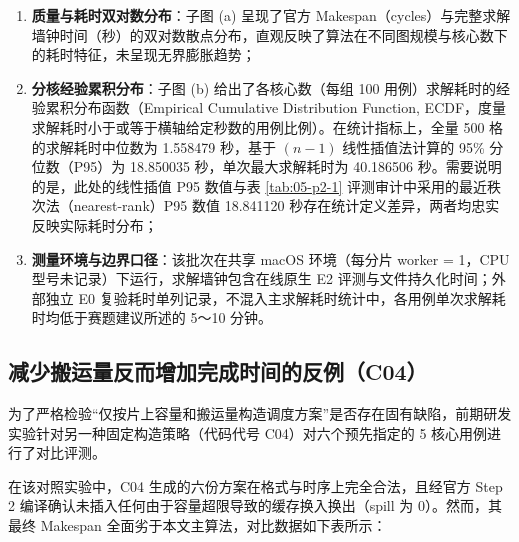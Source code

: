 \documentclass[anonymous,withtoc]{gmcm2026}
\providecommand{\tightlist}{\setlength{\itemsep}{0pt}\setlength{\parskip}{0pt}}
\begin{document}
\begin{enumerate}
\def\labelenumi{\arabic{enumi}.}
\tightlist
\item
  \textbf{质量与耗时双对数分布}：子图 (a) 呈现了官方 Makespan（cycles）与完整求解墙钟时间（秒）的双对数散点分布，直观反映了算法在不同图规模与核心数下的耗时特征，未呈现无界膨胀趋势；
\item
  \textbf{分核经验累积分布}：子图 (b) 给出了各核心数（每组 100 用例）求解耗时的经验累积分布函数（Empirical Cumulative Distribution Function, ECDF，度量求解耗时小于或等于横轴给定秒数的用例比例）。在统计指标上，全量 500 格的求解耗时中位数为 1.558479 秒，基于 \((n-1)\) 线性插值法计算的 95\% 分位数（P95）为 18.850035 秒，单次最大求解耗时为 40.186506 秒。需要说明的是，此处的线性插值 P95 数值与表 \ref{tab:05-p2-1} 评测审计中采用的最近秩次法（nearest-rank）P95 数值 18.841120 秒存在统计定义差异，两者均忠实反映实际耗时分布；
\item
  \textbf{测量环境与边界口径}：该批次在共享 macOS 环境（每分片 worker = 1，CPU 型号未记录）下运行，求解墙钟包含在线原生 E2 评测与文件持久化时间；外部独立 E0 复验耗时单列记录，不混入主求解耗时统计中，各用例单次求解耗时均低于赛题建议所述的 5～10 分钟。
\end{enumerate}

\subsection{减少搬运量反而增加完成时间的反例（C04）}

为了严格检验``仅按片上容量和搬运量构造调度方案''是否存在固有缺陷，前期研发实验针对另一种固定构造策略（代码代号 C04）对六个预先指定的 5 核心用例进行了对比评测。

在该对照实验中，C04 生成的六份方案在格式与时序上完全合法，且经官方 Step 2 编译确认未插入任何由于容量超限导致的缓存换入换出（spill 为 0）。然而，其最终 Makespan 全面劣于本文主算法，对比数据如下表所示：
\end{document}
